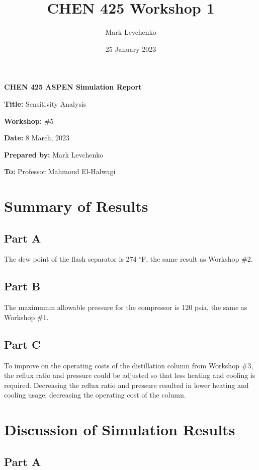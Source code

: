 \documentclass[12pt]{article}
\title{CHEN 425 Workshop 1}
\author{Mark Levchenko}
\date{25 January 2023}
\begin{document}

\textbf{CHEN 425 ASPEN Simulation Report}

\textbf{Title:} Sensitivity Analysis

\textbf{Workshop:} \#5

\textbf{Date:} 8 March, 2023

\textbf{Prepared by:} Mark Levchenko

\textbf{To:} Professor Mahmoud El-Halwagi


\section{Summary of Results}
\subsection{Part A}

The dew point of the flash separator is 274 $^\circ$F, the same result as Workshop \#2.

\subsection{Part B}

The maximumm allowable pressure for the compressor is 120 psia, the same as Workshop \#1.

\subsection{Part C}

To improve on the operating costs of the distillation column from Workshop \#3, the reflux ratio and pressure could be adjusted so that less heating and cooling is required. Decreasing the reflux ratio and pressure resulted in lower heating and cooling usage, decreasing the operating cost of the column.

\section{Discussion of Simulation Results}

\subsection{Part A}

\begin{center}
    
\end{center}
\end{document}
